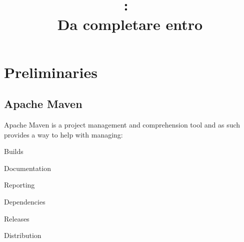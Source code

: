 \documentclass{article}
\title{
\vspace{2in}
\textmd{\textbf{\hmwkClass:\ \hmwkTitle}}\\
\normalsize\vspace{0.1in}\small{Da completare entro \hmwkDueDate}\\
\vspace{0.1in}\large{\textit{\hmwkClassInstructor}}
\vspace{3in}
}
\author{\textbf{\hmwkAuthorName}}
\date{} %
\begin{document}
\maketitle



\newpage
\tableofcontents
\newpage



\section{Preliminaries}
\subsection{Apache Maven}
Apache Maven is a project management and comprehension tool and as such
provides a way to help with managing: 

\begin{compactitem}
\item Builds
\item Documentation
\item Reporting
\item Dependencies
\item Releases
\item Distribution
\end{compactitem}
\end{document}
